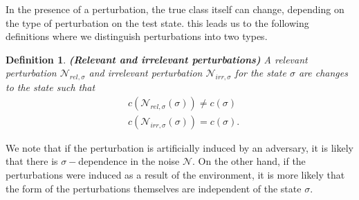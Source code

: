 \documentclass[onecolumn,prx, superscriptaddress,longbibliography,margin=1mm 11pt]{revtex4-2}
\newtheorem{definition}[theorem]{Definition}
\begin{document}
In the presence of a perturbation, the true class itself can change, depending on the type of perturbation on the test state. this leads us to the following definitions where we distinguish perturbations into two types.\\

\begin{definition} \textbf{(Relevant and irrelevant perturbations)} A \textit{relevant perturbation} $\mathcal{N}_{rel, \sigma}$ and \textit{irrelevant perturbation} $\mathcal{N}_{irr, \sigma}$ for the state $\sigma$ are changes to the state such that
\begin{align}
    &c(\mathcal{N}_{rel,\sigma}(\sigma)) \neq c(\sigma) \nonumber \\
    &c(\mathcal{N}_{irr,\sigma}(\sigma))=c(\sigma).
\end{align}
\end{definition}
We note that if the perturbation is artificially induced by an adversary, it is likely that there is $\sigma-$dependence in the noise $\mathcal{N}$. On the other hand, if the perturbations were induced as a result of the environment, it is more likely that the form of the perturbations themselves are independent of the state $\sigma$. \\
\end{document}

